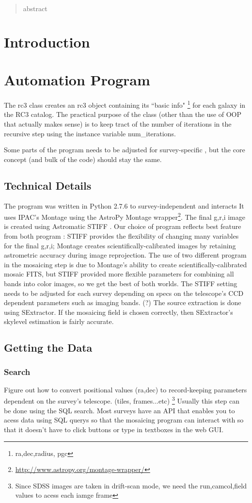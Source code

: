 \documentclass[5p]{elsarticle}
\begin{document}
\begin{abstract}
abstract
\end{abstract}


\section{Introduction}
\section{Automation Program}
	The rc3 class creates an rc3 object containing its ``basic info" \footnote{ ra,dec,radius, pgc} for each galaxy in the RC3 catalog. The practical purpose of the class (other than the use of OOP that actually makes sense) is to keep tract of the number of iterations in the recursive step using the instance variable num\_iterations. 

	Some parts of the program needs to be adjusted for survey-specific , but the core concept (and bulk of the code) should stay the same. 
		\subsection{Technical Details}
	The program was written in Python 2.7.6 to survey-independent and interacts 
 It uses IPAC's Montage  \cite{montage} using the AstroPy Montage wrapper\footnote{\url{http://www.astropy.org/montage-wrapper/}}. The final g,r,i image is created using Astromatic STIFF \cite{stiff} . Our choice of program reflects best feature from both program : STIFF provides the flexibility of changing many variables for the final g,r,i; Montage creates scientifically-calibrated images by retaining astrometric accuracy during image reprojection. The use of two different program in the mosaicing step is due to Montage's ability to create scientifically-calibrated mosaic FITS, but STIFF provided more flexible parameters for combining all bands into color images, so we get the best of both worlds. The STIFF setting needs to be adjusted for each survey depending on specs on the telescope's CCD dependent parameters such as imaging bands. (?) The source extraction is done using SExtractor. If the mosaicing field is chosen correctly, then SExtractor's skylevel estimation is fairly accurate.
	\subsection{Getting the Data}
		\subsubsection{Search}
			Figure out how to convert positional values (ra,dec) to record-keeping parameters dependent on the survey's telescope. (tiles, frames...etc) \footnote{Since SDSS images are taken in drift-scan mode, we need the run,camcol,field values to acess each iamge frame} Usually this step can be done using the SQL search. 
Most surveys have an API that enables you to acess data using SQL querys so that the mosaicing program can interact with so that it doesn't have to  click buttons or type in textboxes in the web GUI. 
\end{document}
